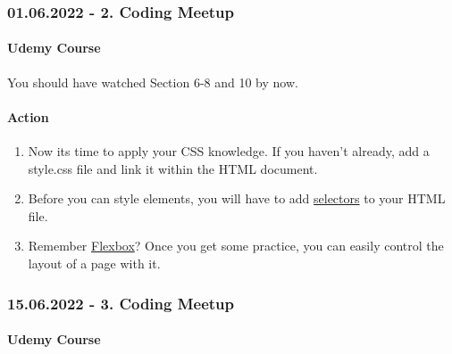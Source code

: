\documentclass[
]{article}
\providecommand{\tightlist}{%
  \setlength{\itemsep}{0pt}\setlength{\parskip}{0pt}}
\begin{document}
\hypertarget{coding-meetup-1}{%
\subsubsection*{01.06.2022 - 2. Coding Meetup}\label{coding-meetup-1}}

\hypertarget{udemy-course-1}{%
\paragraph{Udemy Course}\label{udemy-course-1}}

You should have watched Section 6-8 and 10 by now.

\hypertarget{action-1}{%
\paragraph{Action}\label{action-1}}

\begin{enumerate}
\def\labelenumi{\arabic{enumi}.}
\tightlist
\item
  Now its time to apply your CSS knowledge. If you haven't already, add a style.css file and link it within the HTML document.
\item
  Before you can style elements, you will have to add \href{https://www.udemy.com/course/the-web-developer-bootcamp/learn/lecture/21917636\#overview}{selectors} to your HTML file.
\item
  Remember \href{https://www.udemy.com/course/the-web-developer-bootcamp/learn/lecture/21917734\#overview}{Flexbox}? Once you get some practice, you can easily control the layout of a page with it.
\end{enumerate}

\hypertarget{coding-meetup-2}{%
\subsubsection*{15.06.2022 - 3. Coding Meetup}\label{coding-meetup-2}}

\hypertarget{udemy-course-2}{%
\paragraph{Udemy Course}\label{udemy-course-2}}
\end{document}
